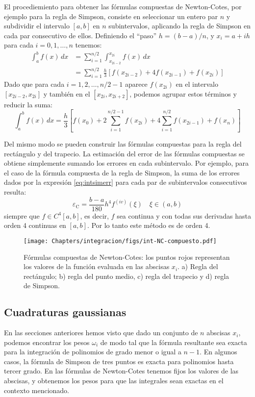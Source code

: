 El procediemiento para obtener las fórmulas compuestas de Newton-Cotes, por ejemplo para la regla de Simpson, consiste en seleccionar un entero par $n$ y subdividir el intervalo $[a, b]$ en $n$ subintervalos, aplicando la regla de Simpson en cada par consecutivo de ellos. Definiendo el ``paso'' $h = (b -a)/n$, y $x_i = a + i h$ para cada $i = 0, 1, \ldots, n$ tenemos:
\begin{align*}
 \int_a^b f(x) \, dx &= \sum_{i=1}^{n/2} \int_{x_{2i-2}}^{x_{2i}} f(x) \, dx \\
  &= \sum_{i=1}^{n/2}  \frac{h}{3} \left[ f(x_{2i-2}) + 4 f(x_{2i-1}) + f(x_{2i}) \right] 
\end{align*} 
Dado que para cada $i = 1, 2, \ldots, n/2 - 1$ aparece $f(x_{2i})$ en el intervalo $[x_{2i-2}, x_{2i}]$ y también en el $[x_{2i}, x_{2i+2}]$, podemos agrupar estos términos y reducir la suma:
\begin{equation}
 \int_a^b f(x) \, dx = \frac{h}{3} \left[ f(x_0) + 2 \sum_{i=1}^{n/2-1} f(x_{2i}) + 4 \sum_{i=1}^{n/2} f(x_{2i-1}) + f(x_n) \right]
\end{equation} 

Del mismo modo se pueden construir las fórmulas compuestas para la regla del rectángulo y del trapecio. La estimación del error de las fórmulas compuestas se obtiene simplemente sumando los errores en cada subintervalo. Por ejemplo, para el caso de la fórmula compuesta de la regla de Simpson, la suma de los errores dados por la expresión  \eqref{eq:intsimerr} para cada par de subintervalos consecutivos resulta:
\[ \varepsilon_{\text{C}} = \frac{b-a}{180} h^4 f^{(iv)}(\xi) \quad \xi \in (a,b) \]
siempre que $f \in C^4[a,b]$, es decir, $f$ sea continua y con todas sus derivadas hasta orden 4 continuas en $[a, b]$. Por lo tanto este método es de orden 4.

\begin{figure}[t]
 \centering
 \texttt{[image: Chapters/integracion/figs/int-NC-compuesto.pdf]}
 \caption{Fórmulas compuestas de Newton-Cotes: los puntos rojos representan los valores de la función evaluada en las abscisas $x_i$. a) Regla del rectángulo; b) regla del punto medio, c) regla del trapecio y d) regla de Simpson.}
 \label{fig:int02}
\end{figure}



\subsection{Cuadraturas gaussianas}
En las secciones anteriores hemos visto que dado un conjunto de $n$ abscisas $x_i$, podemos encontrar los pesos $\omega_i$ de modo tal que la fórmula resultante sea exacta para la integración de polinomios de grado menor o igual a $n-1$. En algunos casos, la fórmula de Simpson de tres puntos es exacta para polinomios hasta tercer grado. En las fórmulas de Newton-Cotes tenemos fijos los valores de las abscisas, y obtenemos los pesos para que las integrales sean exactas en el contexto mencionado.

